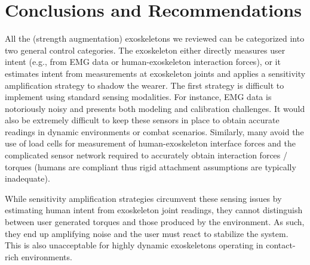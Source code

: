\documentclass[letterpaper,12pt,fullpage]{article}
\begin{document}
%


















\section{Conclusions and Recommendations}
\label{survey:recommend}

All the (strength augmentation) exoskeletons we reviewed can be categorized into two general control categories.  The exoskeleton either directly measures user intent (e.g., from EMG data or human-exoskeleton interaction forces), or it estimates intent from measurements at exoskeleton joints and applies a sensitivity amplification strategy to shadow the wearer.  The first strategy is difficult to implement using standard sensing modalities.  For instance, EMG data is notoriously noisy and presents both modeling and calibration challenges.  It would also be extremely difficult to keep these sensors in place to obtain accurate readings in dynamic environments or combat scenarios.  Similarly, many avoid the use of load cells for measurement of human-exoskeleton interface forces and the complicated sensor network required to accurately obtain interaction forces / torques (humans are compliant thus rigid attachment assumptions are typically inadequate).

While sensitivity amplification strategies circumvent these sensing issues by estimating human intent from exoskeleton joint readings, they cannot distinguish between user generated torques and those produced by the environment.  As such, they end up amplifying noise and the user must react to stabilize the system.  This is also unacceptable for highly dynamic exoskeletons operating in contact-rich environments.
\end{document}
